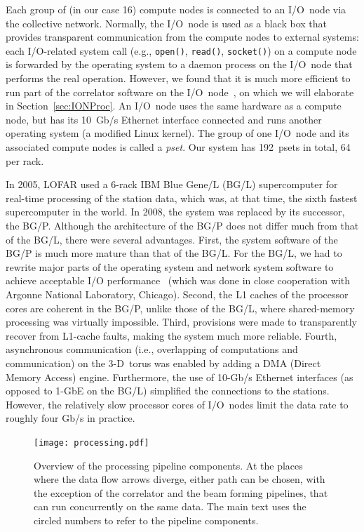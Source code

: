Each group of (in our case 16) compute nodes is connected to an I/O~node via
the collective network.
Normally, the I/O~node is used as a black box that provides transparent
communication from the compute nodes to external systems: each I/O-related
system call (e.g., \texttt{open()}, \texttt{read()}, \texttt{socket()}) on a
compute node is forwarded by the operating system to a daemon process on
the I/O~node that performs the real operation.
However, we found that it is much more efficient to run part of the correlator
software on the I/O~node~\cite{Iskra:08}, on which we will elaborate in
Section~\ref{sec:IONProc}.
An I/O~node uses the same hardware as a compute node, but has its
10~Gb/s Ethernet interface connected and runs another operating system
(a modified Linux kernel).
The group of one I/O~node and its associated compute nodes is called a
\emph{pset}.
Our system has 192~psets in total, 64 per rack.

In 2005, LOFAR used a 6-rack IBM Blue Gene/L (BG/L) supercomputer for real-time
processing of the station data, which was, at that time, the sixth fastest
supercomputer in the world.
In 2008, the system was replaced by its successor, the BG/P.
Although the architecture of the BG/P does not differ much from that
of the BG/L, there were several advantages.
First, the system software of the BG/P is much more mature than that of the
BG/L.
For the BG/L, we had to rewrite major parts of the operating system and network
system software to achieve acceptable I/O
performance~\cite{Iskra:08,Boonstoppel:08} (which was done in close cooperation
with Argonne National Laboratory, Chicago).
Second, the L1 caches of the processor cores are coherent in the BG/P, unlike
those of the BG/L, where shared-memory processing was virtually impossible.
Third, provisions were made to transparently recover from L1-cache faults,
making the system much more reliable.
Fourth, asynchronous communication (i.e., overlapping of computations and
communication) on the 3-D~torus was enabled by adding a DMA (Direct Memory
Access) engine.
Furthermore, the use of 10-Gb/s Ethernet interfaces (as opposed to 1-GbE on
the BG/L) simplified the connections to the stations.
However, the relatively slow processor cores of I/O~nodes limit the data rate
to roughly four Gb/s in practice.


\begin{figure}
\begin{center}
\texttt{[image: processing.pdf]}
\end{center}
\caption{Overview of the processing pipeline components.
At the places where the data flow arrows diverge, either path can be chosen,
with the exception of the correlator and the beam forming pipelines, that can
run concurrently on the same data.
The main text uses the circled numbers to refer to the pipeline components.
}
\label{fig:processing}
\end{figure}


